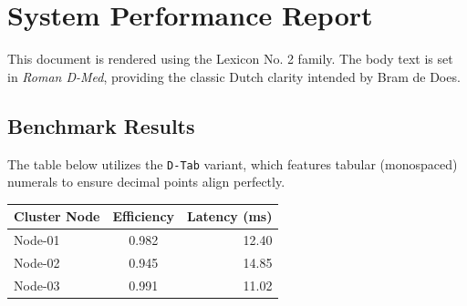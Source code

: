 \documentclass[11pt]{article}
\begin{document}
\section{System Performance Report}

This document is rendered using the Lexicon No. 2 family. The body text is set in \textit{Roman D-Med}, providing the classic Dutch clarity intended by Bram de Does.

\subsection{Benchmark Results}
The table below utilizes the \texttt{D-Tab} variant, which features tabular (monospaced) numerals to ensure decimal points align perfectly.

\begin{center}
{\datafont
\begin{tabular}{lcr}
\toprule
Cluster Node & Efficiency & Latency (ms) \\
\midrule
Node-01 & 0.982 & 12.40 \\
Node-02 & 0.945 & 14.85 \\
Node-03 & 0.991 & 11.02 \\
\bottomrule
\end{tabular}}
\end{center}
\end{document}
